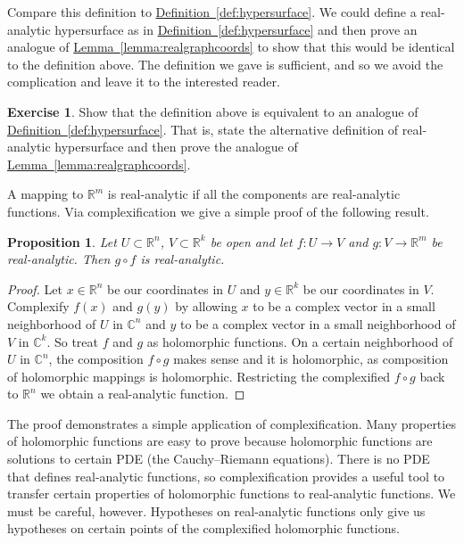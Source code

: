 \documentclass[12pt,openany]{book}
\newcommand{\C}{{\mathbb{C}}}
\newcommand{\R}{{\mathbb{R}}}
\theoremstyle{plain}
\newtheorem{prop}[thm]{Proposition}
\theoremstyle{remark}
\theoremstyle{definition}
\newenvironment{exbox}{%
    \def\FrameCommand{\vrule width 1pt \relax\hspace{10pt}}%
    \MakeFramed{\advance\hsize-\width\FrameRestore}%
}{%
    \endMakeFramed
}
\theoremstyle{exercise}
\newtheorem{exercise}{Exercise}[section]
\theoremstyle{example}
\newcommand{\lemmaref}[1]{\hyperref[#1]{Lemma~\ref*{#1}}}
\newcommand{\defnref}[1]{\hyperref[#1]{Definition~\ref*{#1}}}
\begin{document}
Compare this definition to \defnref{def:hypersurface}.  We could
define a real-analytic hypersurface as in 
\defnref{def:hypersurface} and then prove an analogue of
\lemmaref{lemma:realgraphcoords} to show that this would be identical to the
definition above.  The definition we gave is sufficient, and so we avoid
the complication and leave it to the interested reader.

\begin{exbox}
\begin{exercise}
Show that the definition above is equivalent to an analogue of
\defnref{def:hypersurface}.  That is, state the alternative definition of
real-analytic hypersurface and then prove the analogue of 
\lemmaref{lemma:realgraphcoords}.
\end{exercise}
\end{exbox}

A mapping to $\R^m$ is real-analytic if all the components are real-analytic
functions.  Via complexification we give a simple proof of the following
result.

\begin{prop}
Let $U \subset \R^n$, $V \subset \R^k$ be open and let
$f \colon U \to V$ and $g \colon V \to \R^m$ be real-analytic.
Then $g \circ f$ is real-analytic.
\end{prop}

\begin{proof}
Let $x \in \R^n$ be our coordinates in $U$ and $y \in \R^k$ be
our coordinates in $V$.  Complexify $f(x)$ and $g(y)$ by
allowing $x$ to be a complex vector in a small neighborhood of $U$ in
$\C^n$
and $y$ to be a complex vector in a small neighborhood of $V$ in $\C^k$.
So treat $f$ and $g$ as holomorphic functions.  On a certain
neighborhood of $U$ in $\C^n$, the composition $f \circ g$ makes sense
and it is holomorphic, as composition of holomorphic mappings is holomorphic.
Restricting the complexified $f \circ g$ back to $\R^n$ we obtain a
real-analytic function.
\end{proof}

The proof demonstrates a simple application of complexification.  Many
properties of holomorphic functions are easy to prove because
holomorphic functions are solutions to certain PDE (the Cauchy--Riemann
equations).  There is no PDE
that defines real-analytic functions, so complexification provides a useful
tool to transfer certain properties of holomorphic functions to
real-analytic functions.  We must be careful, however.  Hypotheses on
real-analytic functions only give us hypotheses on certain points of the
complexified holomorphic functions.
\end{document}
